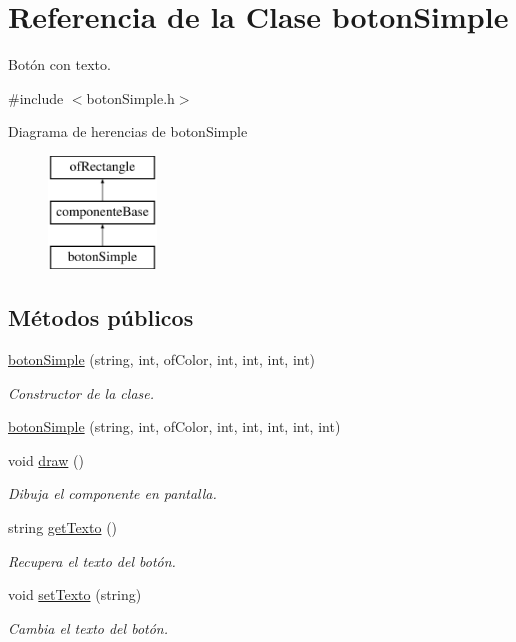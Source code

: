 \hypertarget{classboton_simple}{}\section{Referencia de la Clase boton\+Simple}
\label{classboton_simple}


Botón con texto.  




{\ttfamily \#include $<$boton\+Simple.\+h$>$}

Diagrama de herencias de boton\+Simple\begin{figure}[H]
\begin{center}
\leavevmode
\includegraphics[height=3.000000cm]{classboton_simple}
\end{center}
\end{figure}
\subsection*{Métodos públicos}
\begin{DoxyCompactItemize}
\item 
\hyperlink{classboton_simple_acbcb5c2f8c673c1de738a2282fdca5de}{boton\+Simple} (string, int, of\+Color, int, int, int, int)
\begin{DoxyCompactList}\small\item\em Constructor de la clase. \end{DoxyCompactList}\item 
\hyperlink{classboton_simple_a2d33b48a7757daaf4c26877ec16eba0e}{boton\+Simple} (string, int, of\+Color, int, int, int, int, int)
\item 
void \hyperlink{classboton_simple_a64baaac5439d0ad0d2ec1a11e23a8ad2}{draw} ()
\begin{DoxyCompactList}\small\item\em Dibuja el componente en pantalla. \end{DoxyCompactList}\item 
string \hyperlink{classboton_simple_a57beca159c5aa3ee7055cd3d8f12d2b7}{get\+Texto} ()
\begin{DoxyCompactList}\small\item\em Recupera el texto del botón. \end{DoxyCompactList}\item 
void \hyperlink{classboton_simple_a2e21e1c5c56d5606cc6f63c5f2bf71b7}{set\+Texto} (string)
\begin{DoxyCompactList}\small\item\em Cambia el texto del botón. \end{DoxyCompactList}\end{DoxyCompactItemize}
